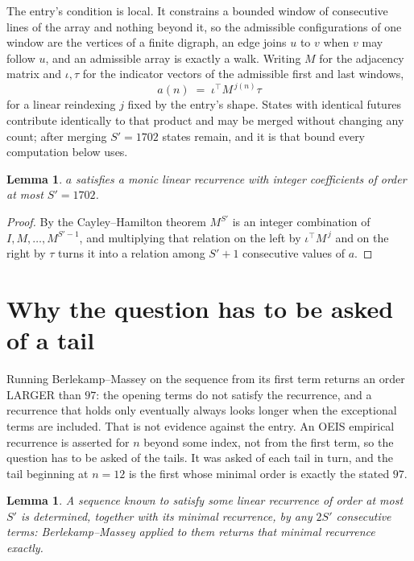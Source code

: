 \documentclass[11pt,a4paper]{article}
\theoremstyle{plain}
\newtheorem{lemma}[theorem]{Lemma}
\theoremstyle{definition}
\begin{document}
The entry's condition is local. It constrains a bounded window of consecutive lines of the
array and nothing beyond it, so the admissible configurations of one window are the vertices of
a finite digraph, an edge joins $u$ to $v$ when $v$ may follow $u$, and an admissible array is
exactly a walk. Writing $M$ for the adjacency matrix and $\iota,\tau$ for the indicator vectors
of the admissible first and last windows,
\[
a(n)\;=\;\iota^{\!\top}M^{\,j(n)}\tau
\]
for a linear reindexing $j$ fixed by the entry's shape. States with identical futures
contribute identically to that product and may be merged without changing any count; after
merging $S'=1702$ states remain, and it is that bound every computation below uses.

\begin{lemma}\label{lem:cf}
$a$ satisfies a monic linear recurrence with integer coefficients of order at most $S'=1702$.
\end{lemma}

\begin{proof}
By the Cayley--Hamilton theorem $M^{S'}$ is an integer combination of $I,M,\dots,M^{S'-1}$,
and multiplying that relation on the left by $\iota^{\!\top}M^{\,j}$ and on the right by
$\tau$ turns it into a relation among $S'+1$ consecutive values of $a$.
\end{proof}

\section{Why the question has to be asked of a tail}

Running Berlekamp--Massey on the sequence from its first term returns an order LARGER than $97$: the opening terms do not satisfy the recurrence, and a recurrence that holds only eventually always looks longer when the exceptional terms are included. That is not evidence against the entry. An OEIS empirical recurrence is asserted for $n$ beyond some index, not from the first term, so the question has to be asked of the tails. It was asked of each tail in turn, and the tail beginning at $n=12$ is the first whose minimal order is exactly the stated $97$.

\begin{lemma}\label{lem:bm}
A sequence known to satisfy some linear recurrence of order at most $S'$ is determined,
together with its minimal recurrence, by any $2S'$ consecutive terms: Berlekamp--Massey applied
to them returns that minimal recurrence exactly.
\end{lemma}
\end{document}
